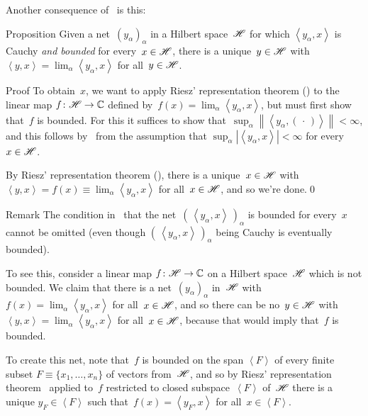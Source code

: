 \documentclass[a]{subfiles}
\begin{document}
\begin{parsec}%
\begin{point}%
	Another consequence of~
	is this:
\end{point}
\begin{point}{Proposition}%
Given a net~$(y_\alpha)_\alpha$
in a Hilbert space~$\mathscr{H}$
for which $\left<y_\alpha,x\right>$
is Cauchy \emph{and bounded}
for every~$x\in \mathscr{H}$,
there is a unique~$y\in\mathscr{H}$
with $\left<y,x\right>=\lim_\alpha \left<y_\alpha,x\right>$
for all~$y\in\mathscr{H}$.
\begin{point}{Proof}%
To obtain~$x$,
we want to apply  Riesz' representation theorem
()
to the linear map $f\colon \mathscr{H}\to\mathbb{C}$
defined by~$f(x)=\lim_\alpha\left<y_\alpha,x\right>$,
but must first show that~$f$ is bounded.
For this it suffices to show
that~$\sup_\alpha \left \|\left<y_\alpha,(\,\cdot\,)\right>\right\|<\infty$,
and this follows by~
from the assumption 
that $\sup_{\alpha} \left|\left<y_\alpha,x\right>\right| <\infty$
for every~$x\in \mathscr{H}$.

By Riesz' representation theorem (),
there is a unique~$x\in\mathscr{H}$ with 
$\left<y,x\right>=f(x)\equiv \lim_\alpha \left<y_\alpha,x\right>$
for all~$x\in \mathscr{H}$,
and so we're done.\qed
\end{point}
\begin{point}{Remark}%
The condition in~ 
that the net~$(\,\left<y_\alpha,x\right>\,)_\alpha$
is bounded for every~$x$ cannot be omitted
(even though $(\,\left<y_\alpha,x\right>\,)_\alpha$
being Cauchy is eventually bounded).

To see this,
consider a linear map $f\colon \mathscr{H}\to\mathbb{C}$ on a Hilbert space~$\mathscr{H}$
which is not bounded.
We claim that there is a net~$(y_\alpha)_\alpha$ in~$\mathscr{H}$
with $f(x)=\lim_\alpha \left<y_\alpha,x\right>$ for all~$x\in\mathscr{H}$,
and so there can be no~$y\in \mathscr{H}$ 
with $\left<y,x\right> = \lim_\alpha \left<y_\alpha,x\right>$
for all~$x\in \mathscr{H}$, because 
that would imply that~$f$ is bounded.

To create this net,
note that~$f$ is bounded
on the span $\left<F\right>$ of every 
finite subset $F\equiv \{x_1,\dotsc,x_n\}$
of vectors from~$\mathscr{H}$,
and so by Riesz' representation theorem~
applied to~$f$ restricted to closed subspace~$\left<F\right>$
of~$\mathscr{H}$ there is a unique $y_F\in \left<F\right>$
such that~$f(x)=\left<y_F,x\right>$
for all~$x\in\left<F\right>$.


\end{point}
\end{point}
\end{parsec}
\end{document}
